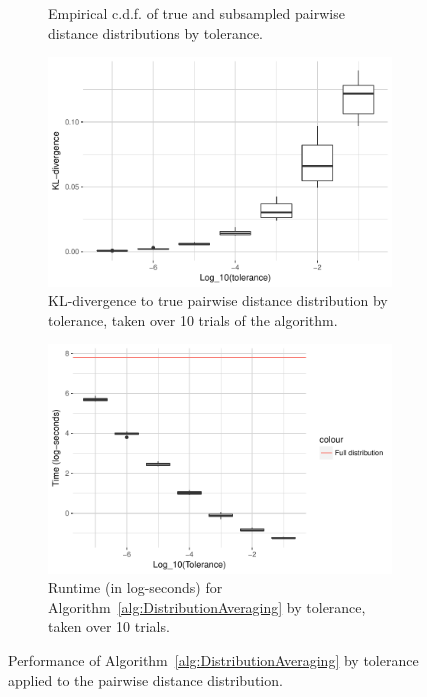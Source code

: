 \documentclass{article}
\begin{document}
\begin{figure}
\begin{subfigure}{.5\textwidth}
    	\caption{Empirical c.d.f. of true and subsampled pairwise distance distributions by tolerance.}
    	\label{fig:ECDF}
    \end{subfigure}
    \begin{subfigure}{.5\textwidth}
        \includegraphics[width=\linewidth]{Figures/PairwiseDistance/div_by_tol.pdf}
    	\caption{KL-divergence to true pairwise distance distribution by tolerance, taken over 10 trials of the algorithm.}
    	\label{fig:Divergences}
	\end{subfigure}
    \begin{subfigure}{.5\textwidth}
    	\includegraphics[width=0.9\linewidth]{Figures/PairwiseDistance/log_time_by_tol.pdf}
    	\caption{Runtime (in log-seconds) for Algorithm~\ref{alg:DistributionAveraging} by tolerance, taken over 10 trials.}
    	\label{fig:Times}
    \end{subfigure}
    \caption{Performance of Algorithm~\ref{alg:DistributionAveraging} by tolerance applied to the pairwise distance distribution.}
\end{figure}
\end{document}
